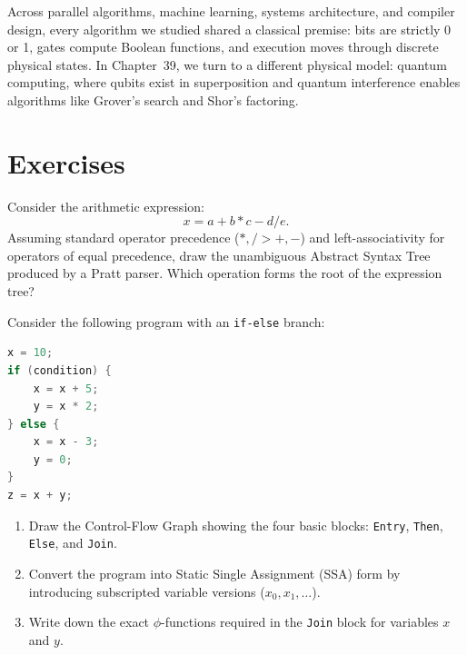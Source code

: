 Across parallel algorithms, machine learning, systems architecture, and compiler
design, every algorithm we studied shared a classical premise: bits are strictly
0 or 1, gates compute Boolean functions, and execution moves through discrete
physical states. In Chapter~39, we turn to a different physical
model: quantum computing, where qubits exist in superposition and quantum
interference enables algorithms like Grover's search and Shor's factoring.

\section*{Exercises}

\begin{exercise}
Consider the arithmetic expression:
\[
  x = a + b * c - d / e.
\]
Assuming standard operator precedence ($*, / > +, -$) and left-associativity
for operators of equal precedence, draw the unambiguous Abstract Syntax Tree
produced by a Pratt parser. Which operation forms the root of the expression tree?
\end{exercise}

\begin{exercise}
Consider the following program with an \texttt{if-else} branch:
\begin{lstlisting}[language=C]
x = 10;
if (condition) {
    x = x + 5;
    y = x * 2;
} else {
    x = x - 3;
    y = 0;
}
z = x + y;
\end{lstlisting}
\begin{enumerate}
  \item Draw the Control-Flow Graph showing the four basic blocks: \texttt{Entry},
  \texttt{Then}, \texttt{Else}, and \texttt{Join}.
  \item Convert the program into Static Single Assignment (SSA) form by introducing
  subscripted variable versions ($x_0, x_1, \dots$).
  \item Write down the exact $\phi$-functions required in the \texttt{Join} block
  for variables $x$ and $y$.
\end{enumerate}
\end{exercise}

